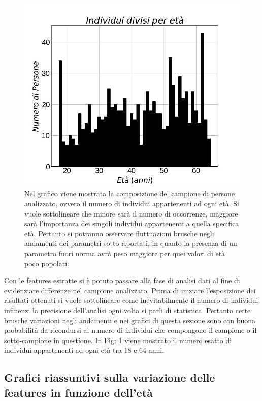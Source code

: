 \documentclass[a4paper, 12pt]{book}
\begin{document}
\begin{figure}[h!]
	\centering
	\includegraphics[width=\textwidth]{campione-age.jpg}
	\caption{Nel grafico viene mostrata la composizione del campione di persone analizzato, ovvero il numero di individui appartenenti ad ogni età.
Si vuole sottolineare che minore sarà il numero di occorrenze, maggiore sarà l'importanza dei singoli individui appartenenti a quella specifica età.
Pertanto si potranno osservare fluttuazioni brusche negli andamenti dei parametri sotto riportati, in quanto la presenza di un parametro fuori norma avrà peso maggiore per quei valori di età poco popolati.}
	\label{fig:campione-age}
\end{figure}


Con le features estratte si è potuto passare alla fase di analisi dati al fine di evidenziare differenze nel campione analizzato.
Prima di iniziare l'esposizione dei risultati ottenuti si vuole sottolineare come inevitabilmente il numero di individui influenzi la precisione dell'analisi ogni volta si parli di statistica.
Pertanto certe brusche variazioni negli andamenti e nei grafici di questa sezione sono con buona probabilità da ricondursi al numero di individui che compongono il campione o il sotto-campione in questione. In Fig: \ref{fig:campione-age} viene mostrato il numero esatto di individui appartenenti ad ogni età tra 18 e 64 anni.



\subsection{Grafici riassuntivi sulla variazione delle features in funzione dell'età}
\end{document}
